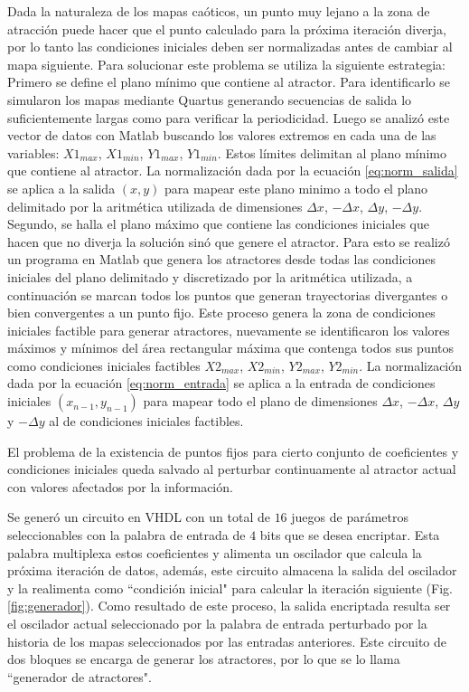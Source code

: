 Dada la naturaleza de los mapas caóticos, un punto muy lejano a la zona de atracción puede hacer que el punto calculado para la próxima iteración diverja, por lo tanto las condiciones iniciales deben ser normalizadas antes de cambiar al mapa siguiente. Para solucionar este problema se utiliza la siguiente estrategia:
 Primero se define el plano mínimo que contiene al atractor. Para
        identificarlo se simularon los mapas mediante Quartus
        generando secuencias de salida lo suficientemente largas como para
        verificar la periodicidad. Luego se analizó este vector de datos
        con Matlab buscando los valores extremos en cada una de las
        variables: $X1_{max}$, $X1_{min}$, $Y1_{max}$, $Y1_{min}$. Estos límites delimitan al plano mínimo que contiene al atractor. La normalización dada por la ecuación \ref{eq:norm_salida} se aplica a la salida $\left(x,y\right)$ para mapear este plano minimo a todo el plano delimitado por la aritmética utilizada de dimensiones $\Delta x$, $-\Delta x$, $\Delta y$, $-\Delta y$.
Segundo, se halla el plano máximo que contiene las condiciones
iniciales que hacen que no diverja la solución sinó que genere el
atractor. Para esto se realizó un programa en Matlab que genera
los atractores desde todas las condiciones iniciales del plano
delimitado y discretizado por la aritmética utilizada, a
continuación se marcan todos los puntos que generan trayectorias
divergantes o bien convergentes a un punto fijo. Este proceso
genera la zona de condiciones iniciales factible para generar
atractores, nuevamente se identificaron los valores máximos y
mínimos del área rectangular máxima que contenga todos sus puntos
como condiciones iniciales factibles $X2_{max}$, $X2_{min}$,
$Y2_{max}$, $Y2_{min}$. La normalización dada por la ecuación
\ref{eq:norm_entrada} se aplica a la entrada de condiciones
iniciales $\left(x_{n-1},y_{n-1}\right)$ para mapear todo el plano
de dimensiones $\Delta x$, $-\Delta x$, $\Delta y$ y $-\Delta y$
al de condiciones iniciales factibles.


El problema de la existencia de puntos fijos para cierto conjunto de
coeficientes y condiciones iniciales queda salvado al perturbar
continuamente al atractor actual con valores afectados por la
información.

Se generó un circuito en VHDL con un total de $16$ juegos de
parámetros seleccionables con la palabra de entrada de $4$ bits
que se desea encriptar. Esta palabra multiplexa estos coeficientes
y alimenta un oscilador que calcula la próxima iteración de datos,
además, este circuito almacena la salida del oscilador y la
realimenta como ``condición inicial" para calcular la iteración
siguiente (Fig. \ref{fig:generador}). Como resultado de este
proceso, la salida encriptada resulta ser el oscilador actual
seleccionado por la palabra de entrada perturbado por la historia
de los mapas seleccionados por las entradas anteriores. Este
circuito de dos bloques se encarga de generar los atractores, por
lo que se lo llama ``generador de atractores".


